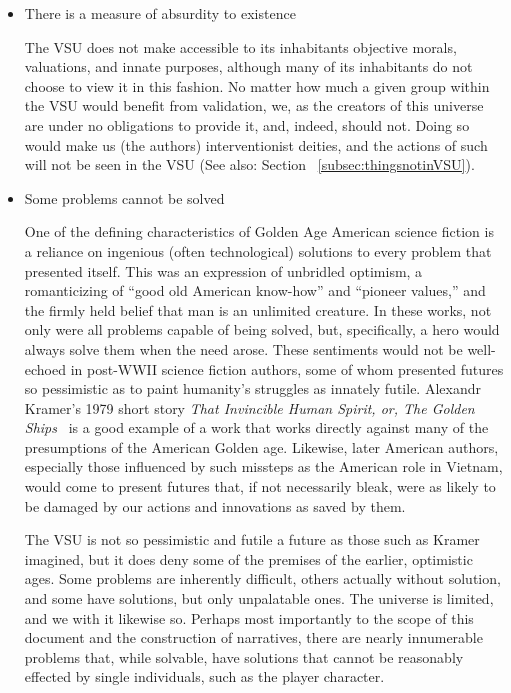 \begin{itemize}

\item There is a measure of absurdity to existence

The VSU does not make accessible to its inhabitants objective morals,
valuations, and innate purposes, although many of its inhabitants do
not choose to view it in this fashion. No matter how much a given
group within the VSU would benefit from validation, we, as the
creators of this universe are under no obligations to provide it, and,
indeed, should not. Doing so would make us (the authors)
interventionist deities, and the actions of such will not be seen in
the VSU (See also: Section ~\ref{subsec:thingsnotinVSU}).

\item Some problems cannot be solved

One of the defining characteristics of Golden Age American science
fiction is a reliance on ingenious (often technological) solutions to
every problem that presented itself. This was an expression of
unbridled optimism, a romanticizing of ``good old American
know-how'' and ``pioneer values,'' and the firmly held belief that man
is an unlimited creature. In these works, not only were all problems
capable of being solved, but, specifically, a hero would always solve
them when the need arose. These sentiments would not be well-echoed in
post-WWII science fiction authors, some of whom presented futures so
pessimistic as to paint humanity's struggles as innately
futile. Alexandr Kramer's 1979 short story
\emph{That Invincible Human Spirit, or, The Golden
Ships}~\cite{GoldenShips} is a good example of a work that works
directly against many of the presumptions of the American Golden
age. Likewise, later American authors, especially those influenced by
such missteps as the American role in Vietnam, would come to present
futures that, if not necessarily bleak, were as likely to be damaged
by our actions and innovations as saved by them.

The VSU is not so pessimistic and futile a future as those such as
Kramer imagined, but it does deny some of the premises of the earlier,
optimistic ages. Some problems are inherently difficult, others
actually without solution, and some have solutions, but only
unpalatable ones. The universe is limited, and we with it likewise
so. Perhaps most importantly to the scope of this document and the
construction of narratives, there are nearly innumerable problems
that, while solvable, have solutions that cannot be reasonably
effected by single individuals, such as the player character.


\end{itemize}
